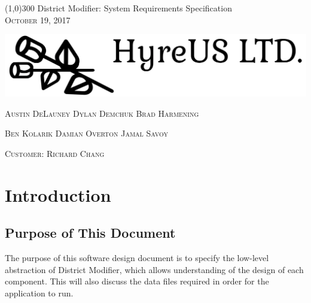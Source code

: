 \documentclass{article}
\begin{document}
\begin{titlepage}

	\begin{center}
 	\line(1,0){300} 
 	\huge{ District Modifier: System Requirements Specification} \\
 	
 	\vspace{1mm} 
 	\textsc{\normalsize October 19, 2017}
 	
 	\vspace{10mm}
	
	\hspace*{-2cm}   
	\includegraphics[scale=.25]{Logo.png}

	\vspace{10mm}
 
 	\textsc{\normalsize Austin DeLauney \quad Dylan Demchuk \quad Brad Harmening}
 	
 	\vspace{2mm}
 	
 	\textsc{\normalsize Ben Kolarik \quad Damian Overton \quad Jamal Savoy}
 
 	\vspace{2mm}
 	
 	\textsc{\normalsize Customer: Richard Chang}
 
 
 	\thispagestyle{empty}
 	
 \end{center}
 \end{titlepage}
 
\tableofcontents
\thispagestyle{empty}
\cleardoublepage

\setcounter{page}{1}

\section{Introduction}\label{sec:intro}

\subsection{Purpose of This Document}

\vspace{2.5mm}

\begin{addmargin}[4em]{0em}
The purpose of this software design document is to specify the low-level abstraction of District Modifier, which allows understanding of the design of each component. This will also discuss the data files required in order for the application to run. 
\end{addmargin}
\end{document}
